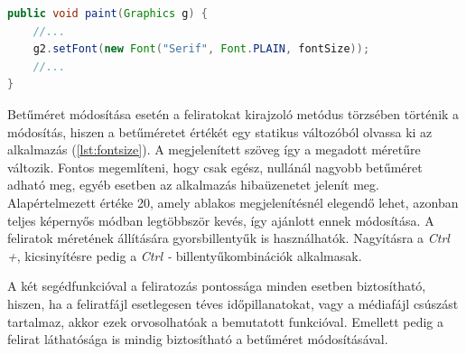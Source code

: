 \begin{spacing}{1.25}
\begin{lstlisting}[caption=Feliratok mérete, label={lst:fontsize}, language=java]
public void paint(Graphics g) {
	//...
	g2.setFont(new Font("Serif", Font.PLAIN, fontSize));
	//...
}
\end{lstlisting}
\end{spacing}

Betűméret módosítása esetén a feliratokat kirajzoló metódus törzsében történik a módosítás, hiszen a betűméretet értékét egy statikus változóból olvassa ki az alkalmazás (\ref{lst:fontsize}). A megjelenített szöveg így a megadott méretűre változik. Fontos megemlíteni, hogy csak egész, nullánál nagyobb betűméret adható meg, egyéb esetben az alkalmazás hibaüzenetet jelenít meg. Alapértelmezett értéke 20, amely ablakos megjelenítésnél elegendő lehet, azonban teljes képernyős módban legtöbbször kevés, így ajánlott ennek módosítása. A feliratok méretének állítására gyorsbillentyűk is használhatók. Nagyításra a \textit{Ctrl +}, kicsinyítésre pedig a \textit{Ctrl -} billentyűkombinációk alkalmasak.

A két segédfunkcióval a feliratozás pontossága minden esetben biztosítható, hiszen, ha a feliratfájl esetlegesen téves időpillanatokat, vagy a médiafájl csúszást tartalmaz, akkor ezek orvosolhatóak a bemutatott funkcióval. Emellett pedig a felirat láthatósága is mindig biztosítható a betűméret módosításával.